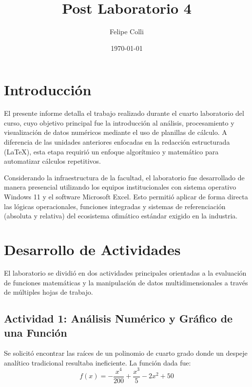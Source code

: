 \documentclass[11pt]{article}
\title{Post Laboratorio 4}
\author{Felipe Colli}
\date{\today}
\begin{document}
\maketitle
\thispagestyle{fancy}

\section{Introducción}

El presente informe detalla el trabajo realizado durante el cuarto laboratorio del curso, cuyo objetivo principal fue la introducción al análisis, procesamiento y visualización de datos numéricos mediante el uso de planillas de cálculo. A diferencia de las unidades anteriores enfocadas en la redacción estructurada (\LaTeX), esta etapa requirió un enfoque algorítmico y matemático para automatizar cálculos repetitivos.

Considerando la infraestructura de la facultad, el laboratorio fue desarrollado de manera presencial utilizando los equipos institucionales con sistema operativo Windows 11 y el software Microsoft Excel. Esto permitió aplicar de forma directa las lógicas operacionales, funciones integradas y sistemas de referenciación (absoluta y relativa) del ecosistema ofimático estándar exigido en la industria.

\section{Desarrollo de Actividades}

El laboratorio se dividió en dos actividades principales orientadas a la evaluación de funciones matemáticas y la manipulación de datos multidimensionales a través de múltiples hojas de trabajo.

\subsection{Actividad 1: Análisis Numérico y Gráfico de una Función}
Se solicitó encontrar las raíces de un polinomio de cuarto grado donde un despeje analítico tradicional resultaba ineficiente. La función dada fue:
\begin{equation}
	f(x) = -\frac{x^4}{200} + \frac{x^3}{5} - 2x^2 + 50
\end{equation}
\end{document}
